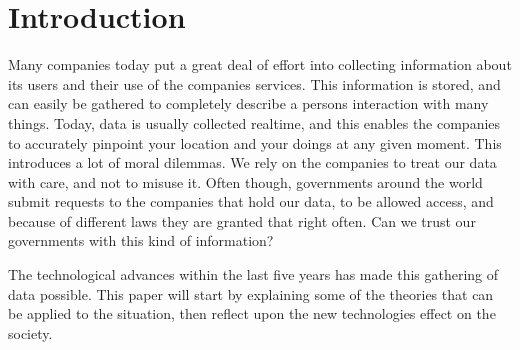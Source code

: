 \section{Introduction}
Many companies today put a great deal of effort into collecting information about its users and their use of the companies services. This information is stored, and can easily be gathered to completely describe a persons interaction with many things. Today, data is usually collected realtime, and this enables the companies to accurately pinpoint your location and your doings at any given moment. This introduces a lot of moral dilemmas. We rely on the companies to treat our data with care, and not to misuse it. Often though, governments around the world submit requests to the companies that hold our data, to be allowed access, and because of different laws they are granted that right often. Can we trust our governments with this kind of information?

The technological advances within the last five years has made this gathering of data possible.
This paper will start by explaining some of the theories that can be applied to the situation, then reflect upon the new technologies effect on the society.
\newpage
